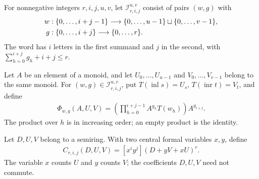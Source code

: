 \begin{definition}
    \label{def:two_marker_middle_index}
    \leanok
    For nonnegative integers $r,i,j,u,v$, let $\mathcal I_{r,i,j}^{u,v}$ consist
    of pairs $(w,g)$ with
    \begin{align}
        w & :\{0,\ldots,i+j-1\}\longrightarrow
        \{0,\ldots,u-1\}\sqcup\{0,\ldots,v-1\},\notag       \\
        g & :\{0,\ldots,i+j\}\longrightarrow\{0,\ldots,r\}.
        \label{eq:two_marker_index_data}
    \end{align}
    The word has $i$ letters in the first summand and $j$ in the second, with
    $\sum_{h=0}^{i+j}g_h+i+j\le r$.
\end{definition}

\begin{definition}
    \label{def:two_marker_middle_product}
    \leanok
    Let $A$ be an element of a monoid, and let $U_0,\ldots,U_{u-1}$ and
    $V_0,\ldots,V_{v-1}$ belong to the same monoid. For
    $(w,g)\in\mathcal I_{r,i,j}^{u,v}$, put $T(\operatorname{inl}s)=U_s$,
    $T(\operatorname{inr}t)=V_t$, and define
    \begin{align}
        \Phi_{w,g}(A,U,V)
        =\left(\prod_{h=0}^{i+j-1} A^{g_h}T(w_h)\right)A^{g_{i+j}}.
        \label{eq:two_marker_middle_product}
    \end{align}
    The product over $h$ is in increasing order; an empty product is the
    identity.
\end{definition}

\begin{definition}
    \label{def:two_marker_coefficient}
    \leanok
    Let $D,U,V$ belong to a semiring. With two central formal variables $x,y$,
    define
    \begin{align}
        C_{r,i,j}(D,U,V)=[x^i y^j](D+yV+xU)^r.
        \label{eq:two_marker_coefficient}
    \end{align}
    The variable $x$ counts $U$ and $y$ counts $V$; the coefficients $D,U,V$
    need not commute.
\end{definition}

